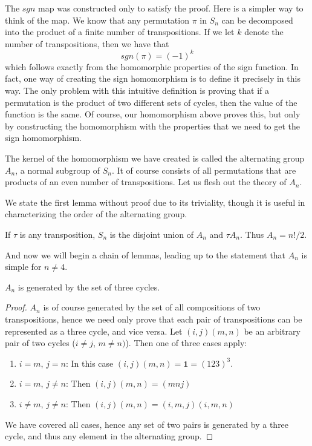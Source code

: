 The $sgn$ map was constructed only to satisfy the proof. Here is a simpler way to think of the map. We know that any permutation $\pi$ in $S_n$ can be decomposed into the product of a finite number of transpositions. If we let $k$ denote the number of transpositions, then we have that
%
\[ sgn(\pi) = (-1)^k \]
%
which follows exactly from the homomorphic properties of the sign function. In fact, one way of creating the sign homomorphism is to define it precisely in this way. The only problem with this intuitive definition is proving that if a permutation is the product of two different sets of cycles, then the value of the function is the same. Of course, our homomorphism above proves this, but only by constructing the homomorphism with the properties that we need to get the sign homomorphism.

The kernel of the homomorphism we have created is called the alternating group $A_n$, a normal subgroup of $S_n$. It of course consists of all permutations that are products of an even number of transpositions. Let us flesh out the theory of $A_n$.

We state the first lemma without proof due to its triviality, though it is useful in characterizing the order of the alternating group.

\begin{lemma} If $\tau$ is any transposition, $S_n$ is the disjoint union of $A_n$ and $\tau A_n$. Thus $A_n = n!/2$. \end{lemma}

And now we will begin a chain of lemmas, leading up to the statement that $A_n$ is simple for $n \neq 4$.

\begin{lemma}
    $A_n$ is generated by the set of three cycles.
\end{lemma}
\begin{proof}
    $A_n$ is of course generated by the set of all compositions of two transpositions, hence we need only prove that each pair of transpositions can be represented as a three cycle, and vice versa. Let $(i, j)(m, n)$ be an arbitrary pair of two cycles ($i \neq j$, $m \neq n)$). Then one of three cases apply:
    \vspace{-3mm}
    \begin{enumerate}
        \item $i = m$, $j = n$: In this case $(i, j)(m, n) = \mathbf{1} = (1 2 3)^3$.
        \item $i = m$, $j \neq n$: Then $(i, j)(m, n) = (m n j)$
        \item $i \neq m$, $j \neq n$: Then $(i, j)(m, n) = (i, m, j)(i, m, n)$\\
    \end{enumerate}
    \vspace{-7mm}
    We have covered all cases, hence any set of two pairs is generated by a three cycle, and thus any element in the alternating group.
\end{proof}

